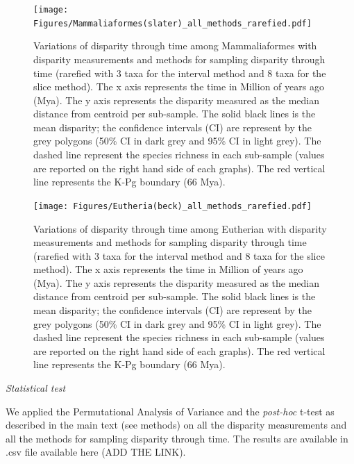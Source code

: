 \documentclass[12pt,letterpaper]{article}
\renewcommand{\subsection}[1]{%
\bigskip
\begin{center}
\begin{large}
\normalfont\itshape #1
\end{large}
\end{center}}
\begin{document}
\begin{landscape}
\begin{figure}[!htbp]
\centering
    \texttt{[image: Figures/Mammaliaformes(slater)\_all\_methods\_rarefied.pdf]}
\caption{Variations of disparity through time among Mammaliaformes with disparity measurements and methods for sampling disparity through time (rarefied with 3 taxa for the interval method and 8 taxa for the slice method). The x axis represents the time in Million of years ago (Mya). The y axis represents the disparity measured as the median distance from centroid per sub-sample. The solid black lines is the mean disparity; the confidence intervals (CI) are represent by the grey polygons (50\% CI in dark grey and 95\% CI in light grey). The dashed line represent the species richness in each sub-sample (values are reported on the right hand side of each graphs). The red vertical line represents the K-Pg boundary (66 Mya).}
\end{figure}
\end{landscape}

\begin{landscape}
\begin{figure}[!htbp]
\centering
    \texttt{[image: Figures/Eutheria(beck)\_all\_methods\_rarefied.pdf]}
\caption{Variations of disparity through time among Eutherian with disparity measurements and methods for sampling disparity through time (rarefied with 3 taxa for the interval method and 8 taxa for the slice method). The x axis represents the time in Million of years ago (Mya). The y axis represents the disparity measured as the median distance from centroid per sub-sample. The solid black lines is the mean disparity; the confidence intervals (CI) are represent by the grey polygons (50\% CI in dark grey and 95\% CI in light grey). The dashed line represent the species richness in each sub-sample (values are reported on the right hand side of each graphs). The red vertical line represents the K-Pg boundary (66 Mya).}
\end{figure}
\end{landscape}

\subsection{Statistical test}
We applied the Permutational Analysis of Variance \citep{permanova} and the \textit{post-hoc} t-test as described in the main text (see methods) on all the disparity measurements and all the methods for sampling disparity through time.
The results are available in .csv file available here (ADD THE LINK).






\end{document}
